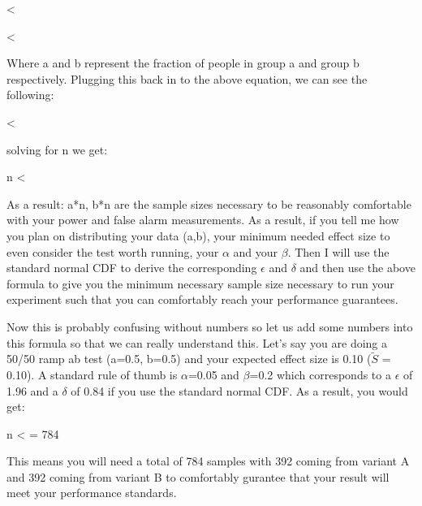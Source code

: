 \beq
{} < 
\eeq

\beq
{} <  
\eeq

Where a and b represent the fraction of people in group a and group b respectively.  Plugging this back in to the above equation, we can see 
the following:

\beq
{} < 
\eeq

solving for n we get:

\beq
n < 
\eeq

As a result: a*n, b*n are the sample sizes necessary to be reasonably comfortable with your power and false alarm measurements. As a result, 
if you tell me how you plan on distributing your data (a,b), your minimum needed effect size to even consider the test worth running,
your $\alpha$ and your $\beta$. Then I will use the standard normal CDF to derive the corresponding $\epsilon$ and $\delta$ and then
use the above formula to give you the minimum necessary sample size necessary to run your experiment such that you can comfortably
reach your performance guarantees. 

Now this is probably confusing without numbers so let us add some numbers into this formula so that we can really understand this.
Let's say you are doing a 50/50 ramp ab test (a=0.5, b=0.5) and your expected effect size is 0.10 ($\widetilde{S}$ = 0.10). A standard rule of thumb
is $\alpha$=0.05 and $\beta$=0.2 which corresponds to a $\epsilon$ of 1.96 and a $\delta$ of 0.84 if you use the standard normal CDF. As a result, you 
would get: 

\beq
n <  = 784
\eeq

This means you will need a total of 784 samples with 392 coming from variant A and 392 coming from variant B to comfortably gurantee 
that your result will meet your performance standards.
